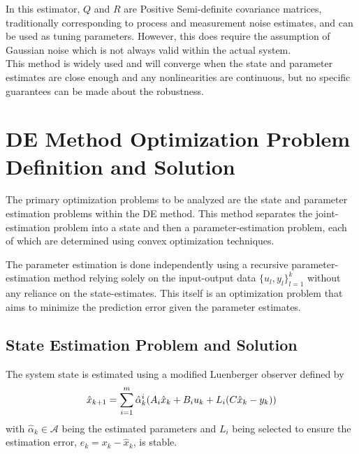 \documentclass[]{ieeetran}
\begin{document}
In this estimator, $Q$ and $R$ are Positive Semi-definite covariance matrices, traditionally corresponding to process and measurement noise estimates, and can be used as tuning parameters. However, this does require the assumption of Gaussian noise which is not always valid within the actual system.\\
This method is widely used and will converge when the state and parameter estimates are close enough and any nonlinearities are continuous, but no specific guarantees can be made about the robustness.




\section{DE Method Optimization Problem Definition and Solution \cite{beelen2017joint}} \label{sec:DE_method_opt_pblm}
The primary optimization problems to be analyzed are the state and parameter estimation problems within the DE method. This method separates the joint-estimation problem into a state and then a parameter-estimation problem, each of which are determined using convex optimization techniques.

The parameter estimation is done independently using a recursive parameter-estimation method relying solely on the input-output data $\{u_l , y_l\}_{l=1}^k$ without any reliance on the state-estimates. This itself is an optimization problem that aims to minimize the prediction error given the parameter estimates.

\subsection{State Estimation Problem and Solution}
The system state is estimated using a modified Luenberger observer defined by
\begin{equation} \label{eq:DE_state_observer_form}
	\hat{x}_{k+1} = \sum_{i=1}^m \hat{\alpha}_k^i \qty(A_i \hat{x}_k + B_i u_k + L_i \qty(C \hat{x}_k - y_k))
\end{equation}
with $\hat{\alpha}_k \in \mathcal{A}$ being the estimated parameters and $L_i$ being selected to ensure the estimation error, $e_k = x_k - \hat{x}_k$, is stable.
\end{document}
